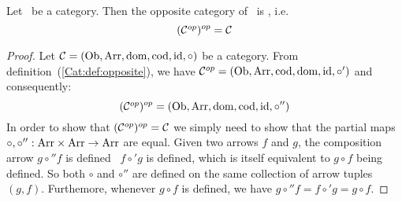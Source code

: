 \begin{prop}
    Let \Cat\ be a category. Then the opposite category of \Cop\ is \Cat, i.e.
        \[
            (\mbox{${\cal C}^{op}$})^{op} = \mbox{$\cal C$}
        \]
\end{prop}
\begin{proof}
    Let $\mbox{$\cal C$}=(\mbox{\rm Ob}, \mbox{\rm Arr}, \mbox{\rm dom},\mbox{\rm cod}, \mbox{\rm id}, \circ)$ be a category. From
    definition~(\ref{Cat:def:opposite}), we have
    $\mbox{${\cal C}^{op}$}=(\mbox{\rm Ob}, \mbox{\rm Arr}, \mbox{\rm cod}, \mbox{\rm dom}, \mbox{\rm id}, \circ')$ and consequently:
        \[
            (\mbox{${\cal C}^{op}$})^{op}=(\mbox{\rm Ob}, \mbox{\rm Arr}, \mbox{\rm dom}, \mbox{\rm cod}, \mbox{\rm id}, \circ'')
        \]
    In order to show that $(\mbox{${\cal C}^{op}$})^{op}=\mbox{$\cal C$}$ we simply need to show that
    the partial maps $\circ,\circ'':\mbox{\rm Arr}\times\mbox{\rm Arr}\to\mbox{\rm Arr}$ are equal.
    Given two arrows $f$ and $g$, the composition arrow $g\circ'' f$ is 
    defined \ifand\ $f\circ' g$ is defined, which is itself equivalent to 
    $g\circ f$ being defined. So both $\circ$ and $\circ''$ are defined
    on the same collection of arrow tuples $(g,f)$. Furthemore, whenever
    $g\circ f$ is defined, we have $g\circ'' f=f\circ' g=g\circ f$.
\end{proof}

